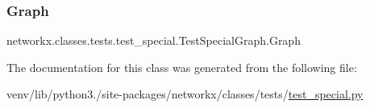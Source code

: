 \subsubsection{\texorpdfstring{Graph}{Graph}}
{\footnotesize\ttfamily networkx.\+classes.\+tests.\+test\+\_\+special.\+Test\+Special\+Graph.\+Graph}



The documentation for this class was generated from the following file\+:\begin{DoxyCompactItemize}
\item 
venv/lib/python3./site-\/packages/networkx/classes/tests/\hyperlink{test__special_8py}{test\+\_\+special.\+py}\end{DoxyCompactItemize}
